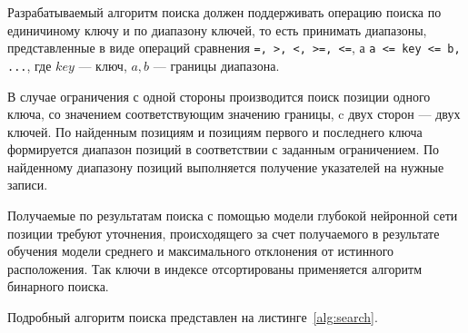
Разрабатываемый алгоритм поиска должен поддерживать операцию поиска по
единичиному ключу и по диапазону ключей, то есть принимать диапазоны,
представленные в виде операций сравнения \texttt{=, >, <, >=, <=}, а \texttt{a
<= key <= b, ...}, где $key$ --- ключ, $a, b$ --- границы диапазона.

В случае ограничения с одной стороны производится поиск позиции одного ключа, со
значением соответствующим значению границы, c двух сторон --- двух ключей.  По
найденным позициям и позициям первого и последнего ключа формируется диапазон
позиций в соответствии с заданным ограничением. По найденному диапазону позиций
выполняется получение указателей на нужные записи.

Получаемые по результатам поиска с помощью модели глубокой нейронной сети
позиции требуют уточнения, происходящего за счет получаемого в результате
обучения модели среднего и максимального отклонения от истинного расположения.
Так ключи в индексе отсортированы применяется алгоритм бинарного поиска.

Подробный алгоритм поиска представлен на листинге~\ref{alg:search}.
\vspace{0.5cm}

